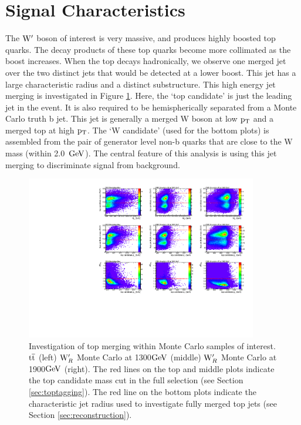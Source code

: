 \section{Signal Characteristics}
\label{sec:sigchar}
\label{sec:GenBptCut}
The $\mathrm{W}^\prime$ boson of interest is very massive, and produces highly boosted top quarks.  The decay products of these top quarks become more collimated as the boost 
increases.  When the top decays hadronically, we observe one merged jet over the two distinct jets that would be detected at a lower boost.  This jet has a 
large characteristic radius and a distinct substructure.  This high energy jet merging is investigated in Figure \ref{figs:topmerge}.  Here, the `top candidate' 
is just the leading jet in the event.  It is also required to be hemispherically separated from a Monte Carlo truth b jet.  This jet is generally a merged W boson at low $\mathrm{p_{T}}$ and a merged top at high $\mathrm{p_{T}}$.
The `W candidate' (used for the bottom plots) is assembled from the pair of generator level non-b quarks that are close to the W mass (within 2.0~$\mathrm{GeV}$).  
The central feature of this analysis is using this jet merging to discriminate signal from background.

\begin{figure}[htcb]
\centering
\includegraphics[width=0.9\textwidth]{AN-13-004/figs/topmerge.pdf}
\caption{Investigation of top merging within Monte Carlo samples of interest.  $\mathrm{t\overline{t}}$ (left) $\mathrm{W}^\prime_R$ Monte Carlo at 1300$\mathrm{GeV}$ (middle) $\mathrm{W}^\prime_R$ Monte Carlo at 1900$\mathrm{GeV}$ (right).  The red lines on the top and middle plots indicate the top candidate mass cut in the full selection (see Section \ref{sec:toptagging}).  The red line on the bottom plots indicate the characteristic jet radius used to investigate fully merged top jets (see Section \ref{sec:reconstruction}).}
\label{figs:topmerge}
\end{figure}

